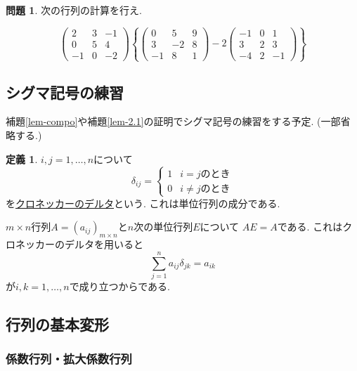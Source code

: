 \documentclass[dvipdfmx,a4paper,11pt]{article}
\theoremstyle{definition}
\newtheorem{dfn}[thm]{定義}
\newtheorem{ques}[thm]{問題}
\begin{document}
 
  \begin{ques}
 次の行列の計算を行え.

 $$
 \begin{pmatrix}
 2 &3&-1 \\
 0&5&4\\
 -1&0&-2
 \end{pmatrix}
 \left\{
 \begin{pmatrix}
 0 &5&9 \\
 3&-2&8\\
 -1&8&1
 \end{pmatrix}
 - 2
  \begin{pmatrix}
 -1 &0&1 \\
 3&2&3\\
 -4&2&-1
 \end{pmatrix}
\right\}
 $$
  \end{ques}


 

\subsection{シグマ記号の練習\cite[2.3節]{M}}
補題\ref{lem-compo}や補題\ref{lem-2.1}の証明でシグマ記号の練習をする予定. (一部省略する.)

\begin{tcolorbox}[
    colback = white,
    colframe = green!35!black,
    fonttitle = \bfseries,
    breakable = true]
    \begin{dfn}
    $ i,j =1, \ldots, n$について
 $$
 \delta_{ij} = 
 \begin{cases}
1 & \text{$i=j$のとき}\\
0 & \text{$i \neq j$のとき}
\end{cases}
  $$
を\underline{クロネッカーのデルタ}という.
これは単位行列の成分である. 
 \end{dfn}
 \end{tcolorbox}
 $m \times n$行列$A =(a_{ij})_{m \times n}$と$n$次の単位行列$E$について
 $AE=A$である.
 これはクロネッカーのデルタを用いると
 $$
 \sum_{j=1}^{n}a_{ij}\delta_{jk}
 =
 a_{ik}
 $$
 が$i,k=1, \ldots, n$で成り立つからである.
  
\subsection{行列の基本変形 \cite[2.4節]{M}}

\subsubsection{係数行列・拡大係数行列}
\end{document}
